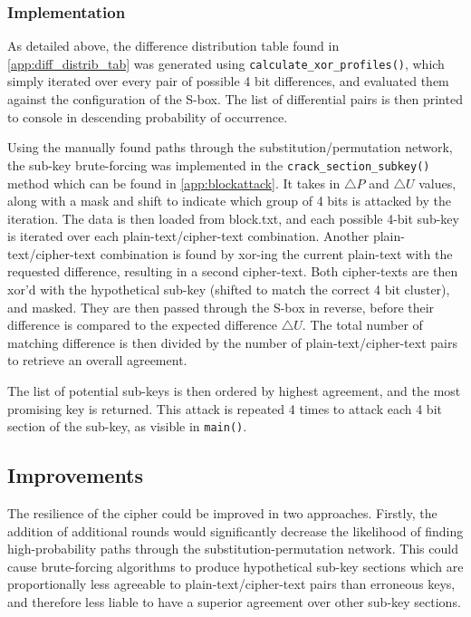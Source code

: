 \documentclass[british,10pt,a4paper]{article}
\begin{document}
\subsubsection{Implementation}
As detailed above, the difference distribution table found in \autoref{app:diff_distrib_tab} was generated using \lstinline{calculate_xor_profiles()}, which simply iterated over every pair of possible 4 bit differences, and evaluated them against the configuration of the S-box. The list of differential pairs is then printed to console in descending probability of occurrence.

Using the manually found paths through the substitution/permutation network, the sub-key brute-forcing was implemented in the \lstinline{crack_section_subkey()} method which can be found in \autoref{app:blockattack}. It takes in $\triangle P$ and $\triangle U$ values, along with a mask and shift to indicate which group of 4 bits is attacked by the iteration. The data is then loaded from block.txt, and each possible 4-bit sub-key is iterated over each plain-text/cipher-text combination. Another plain-text/cipher-text combination is found by xor-ing the current plain-text with the requested difference, resulting in a second cipher-text. Both cipher-texts are then xor'd with the hypothetical sub-key (shifted to match the correct 4 bit cluster), and masked. They are then passed through the S-box in reverse, before their difference is compared to the expected difference $\triangle U$. The total number of matching difference is then divided by the number of plain-text/cipher-text pairs to retrieve an overall agreement.

The list of potential sub-keys is then ordered by highest agreement, and the most promising key is returned. This attack is repeated 4 times to attack each 4 bit section of the sub-key, as visible in \lstinline{main()}.


\subsection{Improvements}
The resilience of the cipher could be improved in two approaches. Firstly, the addition of additional rounds would significantly decrease the likelihood of finding high-probability paths through the substitution-permutation network. This could cause brute-forcing algorithms to produce hypothetical sub-key sections which are proportionally less agreeable to plain-text/cipher-text pairs than erroneous keys, and therefore less liable to have a superior agreement over other sub-key sections. 
\end{document}
